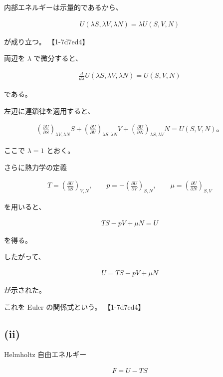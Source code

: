 \documentclass[platex,dvipdfmx,a4paper]{jsarticle}
\begin{document}
内部エネルギーは示量的であるから、

\begin{align*}
U(\lambda S,\lambda V,\lambda N)
=
\lambda U(S,V,N)
\end{align*}

が成り立つ。 【1-7d7ed4】

両辺を $\lambda$ で微分すると、

\begin{align*}
\frac{d}{d\lambda}
U(\lambda S,\lambda V,\lambda N)
=
U(S,V,N)
\end{align*}

である。

左辺に連鎖律を適用すると、

\begin{align*}
\left(
\frac{\partial U}{\partial S}
\right)_{\lambda V,\lambda N}
S
+
\left(
\frac{\partial U}{\partial V}
\right)_{\lambda S,\lambda N}
V
+
\left(
\frac{\partial U}{\partial N}
\right)_{\lambda S,\lambda V}
N
=
U(S,V,N)。
\end{align*}

ここで $\lambda=1$ とおく。

さらに熱力学の定義

\begin{align*}
T
=
\left(
\frac{\partial U}{\partial S}
\right)_{V,N},
\qquad
p
=
-
\left(
\frac{\partial U}{\partial V}
\right)_{S,N},
\qquad
\mu
=
\left(
\frac{\partial U}{\partial N}
\right)_{S,V}
\end{align*}

を用いると、

\begin{align*}
TS-pV+\mu N
=
U
\end{align*}

を得る。

したがって、

\begin{align*}
U
=
TS-pV+\mu N
\end{align*}

が示された。

これを Euler の関係式という。 【1-7d7ed4】

\subsection{(ii)}

Helmholtz 自由エネルギー

\begin{align*}
F=U-TS
\end{align*}
\end{document}
